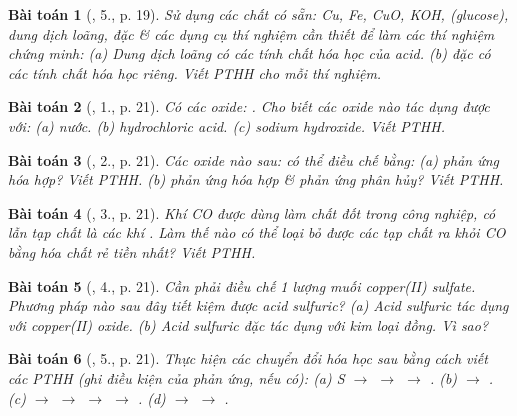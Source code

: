\documentclass{article}
\newtheorem{baitoan}{Bài toán}
\begin{document}
\begin{baitoan}[\cite{SGK_Hoa_Hoc_9}, 5., p. 19]
	Sử dụng các chất có sẵn: {\rm Cu, Fe, CuO, KOH, } (glucose), dung dịch {\rm{}} loãng, {\rm{}} đặc \& các dụng cụ thí nghiệm cần thiết để làm các thí nghiệm chứng minh: (a) Dung dịch {\rm{}} loãng có các tính chất hóa học của acid. (b) {\rm{}} đặc có các tính chất hóa học riêng. Viết PTHH cho mỗi thí nghiệm.
\end{baitoan}

\begin{baitoan}[\cite{SGK_Hoa_Hoc_9}, 1., p. 21]
	Có các oxide: {\rm{}}. Cho biết các oxide nào tác dụng được với: (a) nước. (b) hydrochloric acid. (c) sodium hydroxide. Viết {\rm PTHH}.
\end{baitoan}

\begin{baitoan}[\cite{SGK_Hoa_Hoc_9}, 2., p. 21]
	Các oxide nào sau: {\rm{}} có thể điều chế bằng: (a) phản ứng hóa hợp? Viết PTHH. (b) phản ứng hóa hợp \& phản ứng phân hủy? Viết PTHH.
\end{baitoan}

\begin{baitoan}[\cite{SGK_Hoa_Hoc_9}, 3., p. 21]
	Khí {\rm CO} được dùng làm chất đốt trong công nghiệp, có lẫn tạp chất là các khí {\rm{}}. Làm thế nào có thể loại bỏ được các tạp chất ra khỏi {\rm CO} bằng hóa chất rẻ tiền nhất? Viết {\rm PTHH}.
\end{baitoan}

\begin{baitoan}[\cite{SGK_Hoa_Hoc_9}, 4., p. 21]
	Cần phải điều chế 1 lượng muối copper(II) sulfate. Phương pháp nào sau đây tiết kiệm được acid sulfuric? (a) Acid sulfuric tác dụng với copper(II) oxide. (b) Acid sulfuric đặc tác dụng với kim loại đồng. Vì sao?
\end{baitoan}

\begin{baitoan}[\cite{SGK_Hoa_Hoc_9}, 5., p. 21]
	Thực hiện các chuyển đổi hóa học sau bằng cách viết các PTHH (ghi điều kiện của phản ứng, nếu có): (a) {\rm S $\to$  $\to$  $\to$ }. (b) {\rm{} $\to$ }. (c) {\rm{} $\to$  $\to$  $\to$  $\to$ }. (d) {\rm{} $\to$  $\to$ }.
\end{baitoan}
\end{document}
